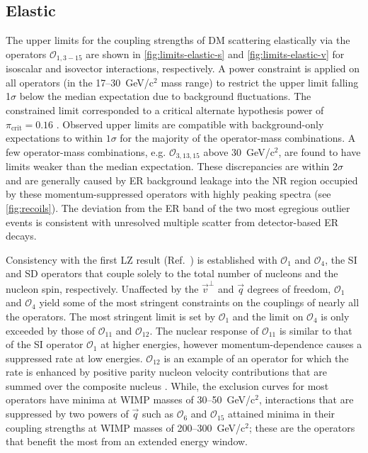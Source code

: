 \documentclass[reprint, showpacs,
preprintnumbers,
amsmath,amssymb,
aps, floatfix,
superscriptaddress,
prd, nofootinbib]{revtex4-1}
\begin{document}
\subsection{Elastic}\label{subsec:elastic}
\par
The upper limits for the coupling strengths of DM scattering elastically via the operators $\mathcal{O}_{1,3-15}$ are shown in \autoref{fig:limits-elastic-s} and \autoref{fig:limits-elastic-v} for isoscalar and isovector interactions, respectively. 
A power constraint is applied on all operators (in the 17--30~GeV/c$^2$ mass range) to restrict the upper limit falling 1$\sigma$ below the median expectation due to background fluctuations. 
The constrained limit corresponded to a critical alternate hypothesis power of $\pi_\text{crit} = 0.16$ \cite{LZ:SR1WS_2022, DM_parameters:BAXTER2021_Conventions, Cowan:2011_power_constraints}.
Observed upper limits are compatible with background-only expectations to within $1\sigma$ for the majority of the operator-mass combinations.
A few operator-mass combinations, e.g. $\mathcal{O}_{3, 13, 15}$ above 30~GeV/c$^2$, are found to have limits weaker than the median expectation.
These discrepancies are within $2\sigma$ and are generally caused by ER background leakage into the NR region occupied by these momentum-suppressed operators with highly peaking spectra (see \autoref{fig:recoils}).
The deviation from the ER band of the two most egregious outlier events is consistent with unresolved multiple scatter from detector-based ER decays.
\par
Consistency with the first LZ result (Ref.~\cite{LZ:SR1WS_2022}) is established with $\mathcal{O}_1$ and $\mathcal{O}_4$, the SI and SD operators that couple solely to the total number of nucleons and the nucleon spin, respectively.
Unaffected by the $\vec{v}^\perp$ and $\vec{q}$ degrees of freedom, $\mathcal{O}_1$ and $\mathcal{O}_4$ yield some of the most stringent constraints on the couplings of nearly all the operators.
The most stringent limit is set by $\mathcal{O}_1$ and the limit on $\mathcal{O}_4$ is only exceeded by those of $\mathcal{O}_{11}$ and $\mathcal{O}_{12}$. 
The nuclear response of $\mathcal{O}_{11}$ is similar to that of the SI operator $\mathcal{O}_1$ at higher energies, however momentum-dependence causes a suppressed rate at low energies. 
$\mathcal{O}_{12}$ is an example of an operator for which the rate is enhanced by positive parity nucleon velocity contributions that are summed over the composite nucleus \cite{Anand:MathematicaEFT}. 
While, the exclusion curves for most operators have minima at WIMP masses of 30--50~GeV/c$^2$, interactions that are suppressed by two powers of $\vec{q}$ such as $\mathcal{O}_6$ and $\mathcal{O}_{15}$ attained minima in their coupling strengths at WIMP masses of 200--300~GeV/c$^2$; these are the operators that benefit the most from an extended energy window.
\end{document}
